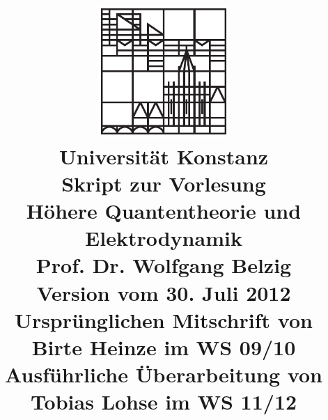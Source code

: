 \usepackage[left=2cm,right=2cm,top=1cm,bottom=1cm,includeheadfoot]{geometry}

\usepackage{fancyhdr}
\pagestyle{fancy}{\fancyhf{}
\fancyhead[LO,RE]{\footnotesize \rightmark}
\fancyfoot[C]{\footnotesize -$\,$\thepage$\;$-}
\renewcommand{\headrulewidth}{0.4pt}
\renewcommand{\footrulewidth}{0pt}}


\usepackage{titlesec}
{}
\newcommand{\kapitel}[2]{$\;$\vspace{-1.5cm} \section[#1]{#2} \rule{17cm}{0.4pt}\vspace{3cm}}
\titleformat{\paragraph}[hang]{\sffamily\bfseries}{\thetitle:}{0ex}{\vspace{-0.15cm}}{\vspace{0.5cm}}

\title{ \vspace{1.5cm}\includegraphics[width=5cm]{logo}
\\ \Large Universität Konstanz  \\ \vspace{4ex} \huge 
Skript zur Vorlesung\\ Höhere Quantentheorie und Elektrodynamik
\\ \vspace{4ex} \Large Prof. Dr. Wolfgang Belzig 
\\ Version vom 30. Juli 2012 \\ \vspace{4.5cm}
\normalsize Ursprünglichen Mitschrift von Birte Heinze im WS 09/10 \\ Ausführliche Überarbeitung von Tobias Lohse im WS 11/12 \vspace{-10cm}}
\author{}
\date{}